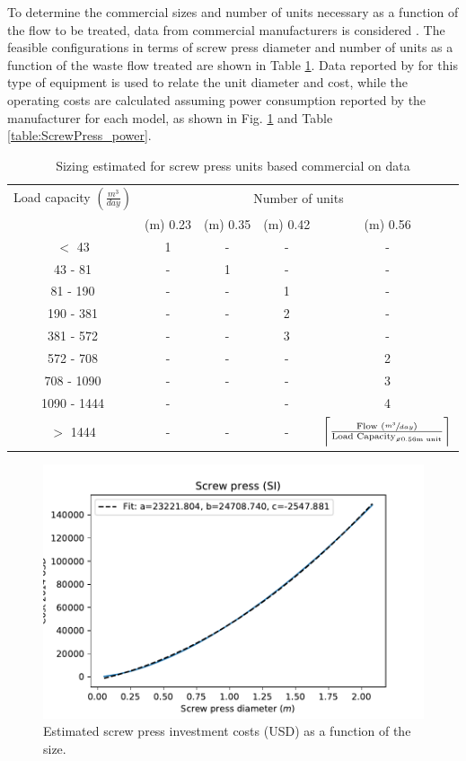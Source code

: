 \documentclass[10pt,a4paper]{article}
\DeclarePairedDelimiter{\ceil}{\lceil}{\rceil}
\begin{document}
To determine the commercial sizes and number of units necessary as a function of the flow to be treated, data from commercial manufacturers is considered . The feasible configurations in terms of screw press diameter and number of units as a function of the waste flow treated are shown in Table \ref{table:ScrewPress_units}. Data reported by  for this type of equipment is used to relate the unit diameter and cost, while the operating costs are calculated assuming power consumption reported by the manufacturer for each model, as shown in Fig. \ref{fig:screwpress_investment_costs} and Table \ref{table:ScrewPress_power}.
\begin{table}[H] 
	\begin{adjustwidth}{}{}
		\centering
		\caption{Sizing estimated for screw press units based commercial on data \protect{}} \label{table:ScrewPress_units}
		\begin{tabular}{c c c c c}
			\toprule
			\multicolumn{1}{c}{Load capacity $\left(\frac{m^{3}}{day}\right)$}&\multicolumn{4}{c}{Number of units}\\
			\cmidrule(lr){2-5}
			&\diameter(m) 0.23 & \diameter(m) 0.35 & \diameter(m) 0.42 & \diameter(m) 0.56	\\ \midrule
			$<$ 43 		& 1 	& - 					& - & -	\\
			43 - 81 	& -						& 1 	& - & - 	\\
			81 - 190 	& -						& - 					& 1 & - 	\\
			190 - 381 	& -						& -					 	& 2 & -	\\ 
			381 - 572 & -						& -					 	& 3 & - 	\\ 
			572 - 708 & -						& -					 	& - & 2	 	\\ 
			708 - 1090 & -						& -					 	& - & 3	 	\\
			1090 - 1444 & -						& \-				 	& - & 4	 	\\
			$>$ 1444 	&-						& -					 	& - & $\ceil[\bigg]{\frac{\text{Flow } \left(\sfrac{m^{3}}{day}\right)}{\text{Load Capacity}_{\text{\diameter 0.56m unit}}}}$  	\\\bottomrule
		\end{tabular}
	\end{adjustwidth}
\end{table}

\begin{figure}[H]
	\centering
	\includegraphics[width=0.6\linewidth, trim={0.5cm 0cm 0cm 0cm},clip]{screwpress_cost_m} 
	\caption{Estimated screw press investment costs (USD) as a function of the size.}
	\label{fig:screwpress_investment_costs}
\end{figure}
\end{document}
